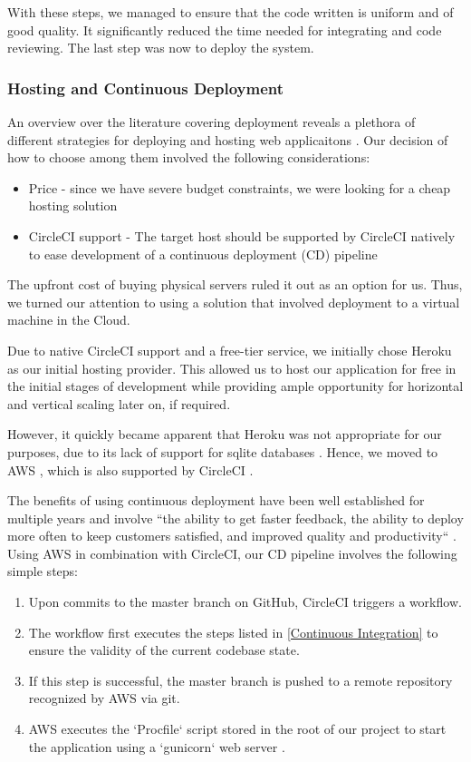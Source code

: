 \documentclass[main.tex]{subfiles}
\begin{document}
With these steps, we managed to ensure that the code written is uniform and of good quality. It significantly reduced the time needed for integrating and code reviewing. The last step was now to deploy the system.

\subsubsection{Hosting and Continuous Deployment}
\label{Continuous Deployment}

An overview over the literature covering deployment reveals a plethora of different strategies for deploying and hosting web applicaitons \cite{ConnollyFundamentals}. Our decision of how to choose among them involved the following considerations:

\begin{itemize}
    \item Price - since we have severe budget constraints, we were looking for a cheap hosting solution
    \item CircleCI support - The target host should be supported by CircleCI natively to ease development of a continuous deployment (CD) pipeline
\end{itemize}

The upfront cost of buying physical servers ruled it out as an option for us. Thus, we turned our attention to using a solution that involved deployment to a virtual machine in the Cloud.

Due to native CircleCI support and a free-tier service, we initially chose Heroku \cite{Heroku} as our initial hosting provider. This allowed us to host our application for free in the initial stages of development while providing ample opportunity for horizontal and vertical scaling later on, if required.

However, it quickly became apparent that Heroku was not appropriate for our purposes, due to its lack of support for sqlite databases \cite{HerokuSqlite}. Hence, we moved to AWS \cite{AWS}, which is also supported by CircleCI \cite{AWSCircleCI}.

The benefits of using continuous deployment have been well established for multiple years and involve ``the ability to get faster feedback, the ability to deploy more often to keep customers satisfied, and improved quality and productivity`` \cite{CDBenefits}. Using AWS in combination with CircleCI, our CD pipeline involves the following simple steps:

\begin{enumerate}
    \item Upon commits to the master branch on GitHub, CircleCI triggers a workflow.
    \item The workflow first executes the steps listed in \ref{Continuous Integration} to ensure the validity of the current codebase state.
    \item If this step is successful, the master branch is pushed to a remote repository recognized by AWS via git.
    \item AWS executes the `Procfile` script stored in the root of our project to start the application using a `gunicorn` web server \cite{Gunicorn}.
\end{enumerate}
\end{document}
